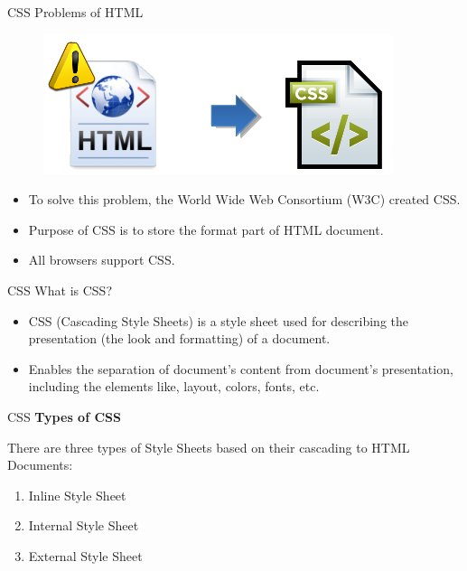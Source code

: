 \documentclass[14pt]{beamer}
\begin{document}
\begin{frame}{CSS}
Problems of HTML

\begin{figure}[H]
   \begin{center}
    \includegraphics[scale=.35]{problems-of-html.png}
   \end{center}
\end{figure}
\begin{itemize}
 \item To solve this problem, the World Wide Web Consortium (W3C) created CSS.
 \item Purpose of CSS is to store the format part of HTML document.
 \item All browsers support CSS.
\end{itemize}
\end{frame}

\begin{frame}{CSS}
What is CSS?
\begin{itemize}
 \item CSS (Cascading Style Sheets) is a style sheet used for describing the presentation (the look and formatting) of a document.
 \item Enables the separation of document's content from document's presentation, including the elements like, layout, colors, fonts, etc.
\end{itemize}
\end{frame}

\begin{frame}{CSS}
\textbf{Types of CSS}

\vspace{1pc}
There are three types of Style Sheets based on their cascading to HTML Documents:
\begin{enumerate}
 \item Inline Style Sheet
 \item Internal Style Sheet
 \item External Style Sheet
\end{enumerate}
\end{frame}
\end{document}
